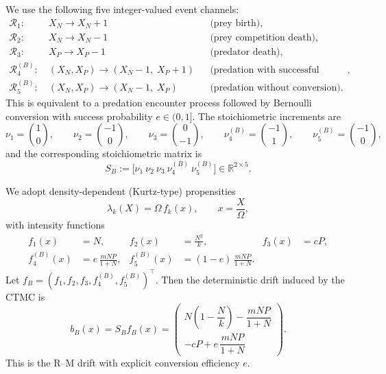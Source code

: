 \documentclass[pdflatex,sn-mathphys-ay]{sn-jnl}
\theoremstyle{thmstyleone}
\theoremstyle{definition}
\theoremstyle{remark}
\begin{document}
We use the following five integer-valued event channels:
\begin{align*}
\mathcal R_1:\ & X_N \longrightarrow X_N+1 
&&\text{(prey birth)},\\
\mathcal R_2:\ & X_N \longrightarrow X_N-1 
&&\text{(prey competition death)},\\
\mathcal R_3:\ & X_P \longrightarrow X_P-1 
&&\text{(predator death)},\\
\mathcal R_4^{(B)}:\ & (X_N,X_P) \longrightarrow (X_N-1,\;X_P+1)
&&\text{(predation with successful conversion)},\\
\mathcal R_5^{(B)}:\ & (X_N,X_P) \longrightarrow (X_N-1,\;X_P)
&&\text{(predation without conversion)}.
\end{align*}
This is equivalent to a predation encounter process followed by Bernoulli conversion with success probability \(e\in(0,1]\). The stoichiometric increments are
\begin{equation}
\label{eq:nu_Bernoulli_paperA}
\nu_1=\binom{1}{0},\qquad
\nu_2=\binom{-1}{0},\qquad
\nu_3=\binom{0}{-1},\qquad
\nu_4^{(B)}=\binom{-1}{1},\qquad
\nu_5^{(B)}=\binom{-1}{0},
\end{equation}
and the corresponding stoichiometric matrix is
\begin{equation}
\label{eq:Stoichiometry_B_paperA}
S_B:=\big[\nu_1\ \nu_2\ \nu_3\ \nu_4^{(B)}\ \nu_5^{(B)}\big]\in\mathbb R^{2\times 5}.
\end{equation}

We adopt density-dependent (Kurtz-type) propensities
\begin{equation}
\label{eq:propensity_density_dependent_paperA}
\lambda_k(X)=\Omega\,f_k(x),\qquad x=\frac{X}{\Omega},
\end{equation}
with intensity functions
\begin{align}
f_1(x)&=N, &
f_2(x)&=\frac{N^2}{k}, &
f_3(x)&=cP, \label{eq:fk_basic_paperA}\\
f_4^{(B)}(x)&=e\,\frac{mNP}{1+N}, &
f_5^{(B)}(x)&=(1-e)\,\frac{mNP}{1+N}. \label{eq:fk_Bernoulli_pred_paperA}
\end{align}
Let \(f_B=(f_1,f_2,f_3,f_4^{(B)},f_5^{(B)})^\top\). Then the deterministic drift induced by the CTMC is
\begin{equation}
\label{eq:drift_Bernoulli_CTMC_paperA}
b_B(x)=S_B f_B(x)=
\begin{pmatrix}
N\!\left(1-\dfrac{N}{k}\right)-\dfrac{mNP}{1+N}\\[6pt]
-cP+e\,\dfrac{mNP}{1+N}
\end{pmatrix}.
\end{equation}
This is the R--M drift with explicit conversion efficiency \(e\). 
\end{document}
